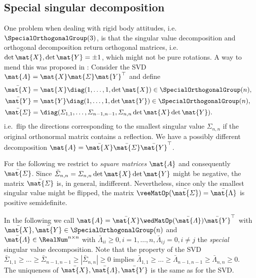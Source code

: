 \subsection{Special singular decomposition}
One problem when dealing with rigid body attitudes, i.e.\ $\SpecialOrthogonalGroup(3)$, is that the singular value decomposition and orthogonal decomposition return orthogonal matrices, i.e.\ $\det\mat{X}, \det\mat{Y} = \pm 1$, which might not be pure rotations.
A way to mend this was proposed in \cite{Kabsch:SSVD}:
Consider the SVD $\mat{A} = \mat{X} \mat{\varSigma} \mat{Y}^\top$ and define 
\begin{subequations}
\begin{align}
 \bar{\mat{X}} &= \mat{X} \diag(1, \ldots, 1, \det\mat{X}) \in \SpecialOrthogonalGroup(n),
\\
 \bar{\mat{Y}} &= \mat{Y} \diag(1, \ldots, 1, \det\mat{Y}) \in \SpecialOrthogonalGroup(n),
\\
 \bar{\mat{\varSigma}} &= \diag(\varSigma_{1,1}, \ldots, \varSigma_{n-1,n-1}, \varSigma_{n,n} \det\mat{X}\det\mat{Y}).
\end{align} 
\end{subequations}
i.e.\ flip the directions corresponding to the smallest singular value $\varSigma_{n,n}$ if the original orthonormal matrix contains a reflection.
We have a possibly different decomposition $\mat{A} = \bar{\mat{X}} \bar{\mat{\varSigma}} \bar{\mat{Y}}^\top$.

For the following we restrict to \textit{square matrices} $\mat{A}$ and consequently $\bar{\mat{\varSigma}}$.
Since $\bar{\varSigma}_{n,n} = \varSigma_{n,n} \det\mat{X}\det\mat{Y}$ might be negative, the matrix $\bar{\mat{\varSigma}}$ is, in general, indifferent.
Nevertheless, since only the smallest singular value might be flipped, the matrix $\veeMatOp(\bar{\mat{\varSigma}}) = \bar{\mat{\Lambda}}$ is positive semidefinite.

In the following we call $\mat{A} = \bar{\mat{X}} \wedMatOp(\bar{\mat{\varLambda}}) \bar{\mat{Y}}^\top$ with $\bar{\mat{X}}, \bar{\mat{Y}} \in \SpecialOrthogonalGroup(n)$ and $\bar{\mat{\varLambda}} \in \RealNum^{n\times n}$ with $\bar{\varLambda}_{ii} \geq 0, i=1,\ldots,n, \bar{\varLambda}_{ij} = 0, i\neq j$ the \textit{special} singular value decomposition.
Note that the property of the SVD $\bar{\varSigma}_{1,1} \geq \ldots \geq \bar{\varSigma}_{n-1,n-1} \geq |\bar{\varSigma}_{n,n}| \geq 0$ implies $\bar{\varLambda}_{1,1} \geq \ldots \geq \bar{\varLambda}_{n-1,n-1} \geq \bar{\varLambda}_{n,n} \geq 0$.
The uniqueness of $\bar{\mat{X}}, \bar{\mat{\varLambda}}, \bar{\mat{Y}}$ is the same as for the SVD.

